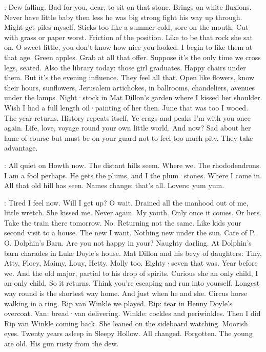 \Bloom:
Dew falling.
Bad for you,
dear,
to sit on that stone.
Brings on white
fluxions.
Never have little baby then less he was big strong fight his way
up through.
Might get piles myself.
Sticks too like a summer cold,
sore on
the mouth.
Cut with grass or paper worst.
Friction of the position.
Like to be that rock she sat on.
O sweet little,
you don't know how nice
you looked.
I begin to like them at that age.
Green apples.
Grab at all
that offer.
Suppose it's the only time we cross legs,
seated.
Also the
library today:
those girl graduates.
Happy chairs under them.
But it's
the evening influence.
They feel all that.
Open like flowers,
know
their hours,
sunflowers,
Jerusalem artichokes,
in ballrooms,
chandeliers,
avenues under the lamps.
Night·stock in Mat Dillon's garden where I kissed
her shoulder.
Wish I had a full length oil·painting of her then.
June
that was too I wooed.
The year returns.
History repeats itself.
Ye crags and peaks I'm with you once again.
Life,
love,
voyage round
your own little world.
And now?
Sad about her lame of course but must
be on your guard not to feel too much pity.
They take advantage.

\Bloom:
All quiet on Howth now.
The distant hills seem.
Where we.
The
rhododendrons.
I am a fool perhaps.
He gets the plums,
and I the
plum·stones.
Where I come in.
All that old hill has seen.
Names change:
that's all.
Lovers:
yum yum.

\Bloom:
Tired I feel now.
Will I get up?
O wait.
Drained all the manhood out
of me,
little wretch.
She kissed me.
Never again.
My youth.
Only once it
comes.
Or hers.
Take the train there tomorrow.
No.
Returning not the
same.
Like kids your second visit to a house.
The new I want.
Nothing new
under the sun.
Care of P.
O.
Dolphin's Barn.
Are you not happy in your?
Naughty darling.
At Dolphin's barn charades in Luke Doyle's house.
Mat
Dillon and his bevy of daughters:
Tiny,
Atty,
Floey,
Maimy,
Louy,
Hetty.
Molly too.
Eighty·seven that was.
Year before we.
And the old major,
partial to his drop of spirits.
Curious she an only child,
I an only
child.
So it returns.
Think you're escaping and run into yourself.
Longest way round is the shortest way home.
And just when he and she.
Circus horse
walking in a ring.
Rip van Winkle we played.
Rip:
tear in Henny Doyle's
overcoat.
Van:
bread·van delivering.
Winkle:
cockles and periwinkles.
Then
I did Rip van Winkle coming back.
She leaned on the sideboard watching.
Moorish eyes.
Twenty years asleep in Sleepy Hollow.
All changed.
Forgotten.
The young are old.
His gun rusty from the dew.

